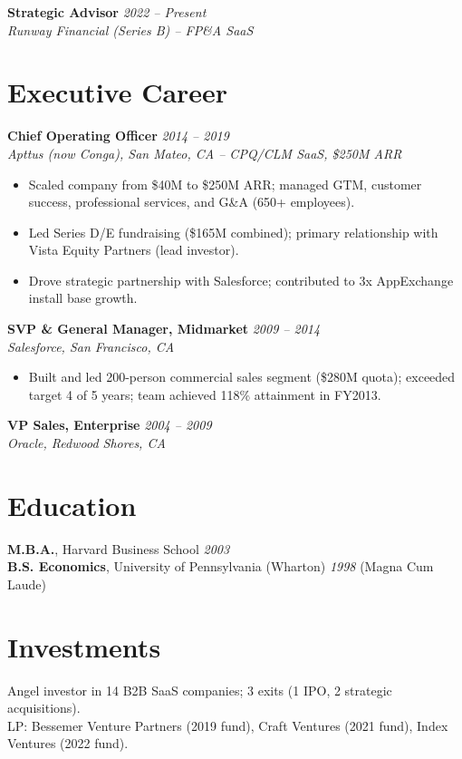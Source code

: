 \documentclass[11pt,a4paper]{article}
\begin{document}
\vspace{4pt}
\noindent\textbf{Strategic Advisor} \hfill \textit{2022 -- Present}\\
\textit{Runway Financial (Series B) -- FP\&A SaaS}

\section{Executive Career}

\noindent\textbf{Chief Operating Officer} \hfill \textit{2014 -- 2019}\\
\textit{Apttus (now Conga), San Mateo, CA -- CPQ/CLM SaaS, \$250M ARR}
\begin{itemize}
  \item Scaled company from \$40M to \$250M ARR; managed GTM, customer success, professional services, and G\&A (650+ employees).
  \item Led Series D/E fundraising (\$165M combined); primary relationship with Vista Equity Partners (lead investor).
  \item Drove strategic partnership with Salesforce; contributed to 3x AppExchange install base growth.
\end{itemize}

\vspace{4pt}
\noindent\textbf{SVP \& General Manager, Midmarket} \hfill \textit{2009 -- 2014}\\
\textit{Salesforce, San Francisco, CA}
\begin{itemize}
  \item Built and led 200-person commercial sales segment (\$280M quota); exceeded target 4 of 5 years; team achieved 118\% attainment in FY2013.
\end{itemize}

\vspace{4pt}
\noindent\textbf{VP Sales, Enterprise} \hfill \textit{2004 -- 2009}\\
\textit{Oracle, Redwood Shores, CA}

\section{Education}
\textbf{M.B.A.}, Harvard Business School \hfill \textit{2003}\\
\textbf{B.S. Economics}, University of Pennsylvania (Wharton) \hfill \textit{1998} \quad (Magna Cum Laude)

\section{Investments}
Angel investor in 14 B2B SaaS companies; 3 exits (1 IPO, 2 strategic acquisitions).\\
LP: Bessemer Venture Partners (2019 fund), Craft Ventures (2021 fund), Index Ventures (2022 fund).
\end{document}
